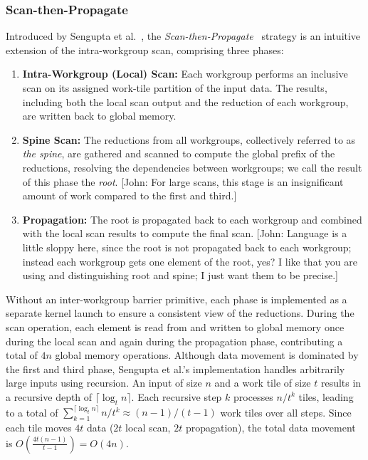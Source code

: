 \documentclass[sigconf]{acmart}
\newcommand{\john}[1]{{\footnotesize\color{cyan}[John: #1]}}
\begin{document}
\subsubsection{Scan-then-Propagate}
Introduced by Sengupta et al.~\cite{10.5555/1280094.1280110}, the \emph{Scan-then-Propagate}~\cite{GPUGems3, Sengupta2008} strategy is an intuitive extension of the intra-workgroup scan, comprising three phases:
\begin{enumerate}
  \item \textbf{Intra-Workgroup (Local) Scan:} Each workgroup performs an inclusive scan on its assigned work-tile partition of the input data. The results, including both the local scan output and the reduction of each workgroup, are written back to global memory.
  \item \textbf{Spine Scan:} The reductions from all workgroups, collectively referred to as \emph{the spine}, are gathered and scanned to compute the global prefix of the reductions, resolving the dependencies between workgroups; we call the result of this phase the \emph{root}. \john{For large scans, this stage is an insignificant amount of work compared to the first and third.}
  \item \textbf{Propagation:} The root is propagated back to each workgroup and combined with the local scan results to compute the final scan. \john{Language is a little sloppy here, since the root is not propagated back to each workgroup; instead each workgroup gets one element of the root, yes? I like that you are using and distinguishing root and spine; I just want them to be precise.}
\end{enumerate}
Without an inter-workgroup barrier primitive, each phase is implemented as a separate kernel launch to ensure a consistent view of the reductions. During the scan operation, each element is read from and written to global memory once during the local scan and again during the propagation phase, contributing a total of $4n$ global memory operations. Although data movement is dominated by the first and third phase, Sengupta et al.'s implementation handles arbitrarily large inputs using recursion. An input of size $n$ and a work tile of size $t$ results in a recursive depth of $\lceil \log_t n \rceil$. Each recursive step $k$ processes $n/t^k$ tiles, leading to a total of $\sum_{k=1}^{\lceil \log_t n \rceil} n/t^k \approx (n - 1)/(t - 1)$ work tiles over all steps. Since each tile moves $4t$ data ($2t$ local scan, $2t$ propagation), the total data movement is $O\left(\frac{4t(n - 1)}{t - 1}\right) = O(4n)$.
\end{document}
